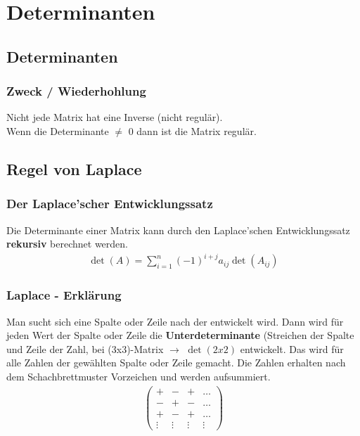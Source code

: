 \section{Determinanten}
\subsection{Determinanten}
\begin{frame}
    \frametitle{Zweck / Wiederhohlung}
    Nicht jede Matrix hat eine Inverse (nicht regulär). \\
    Wenn die Determinante $\neq$ 0 dann ist die Matrix regulär. 
\end{frame}

\subsection{Regel von Laplace}

\begin{frame}
	\frametitle{Der Laplace'scher Entwicklungssatz}
	Die Determinante einer Matrix kann durch den Laplace'schen Entwicklungssatz \textbf{rekursiv} berechnet werden.
	\begin{gather*}
	\det(A) = \sum_{i=1}^n (-1)^{i+j} a_{ij} \det(A_{ij})
	\end{gather*}
\end{frame}

\begin{frame}
	 \frametitle{Laplace - Erklärung}
	Man sucht sich eine Spalte oder Zeile nach der entwickelt wird. 
	Dann wird für jeden Wert der Spalte oder Zeile die \textbf{Unterdeterminante} (Streichen der Spalte und Zeile der Zahl, bei (3x3)-Matrix $\rightarrow$ $\det(2x2)$ entwickelt.
	Das wird für alle Zahlen der gewählten Spalte oder Zeile gemacht.
	Die Zahlen erhalten nach dem Schachbrettmuster Vorzeichen und werden aufsummiert.
	\begin{gather*}
	\begin{pmatrix}
	+ & - & + & \dots \\
	- & + & - & \dots \\
	+ & - & + & \dots \\
	\vdots &  \vdots & \vdots & \vdots 
	\end{pmatrix}
	\end{gather*}
\end{frame}

